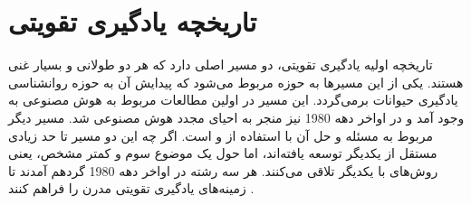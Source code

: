 \section{تاریخچه یادگیری تقویتی}
تاریخچه اولیه یادگیری تقویتی، دو مسیر اصلی دارد که هر دو طولانی و بسیار غنی هستند. یکی از این مسیرها به حوزه  مربوط می‌شود که پیدایش آن به حوزه روانشناسی یادگیری حیوانات برمی‌گردد. این مسیر در اولین مطالعات مربوط به هوش مصنوعی به وجود آمد و در اواخر دهه 1980 نیز منجر به احیای مجدد هوش مصنوعی شد. مسیر دیگر مربوط به مسئله 
\textit{}
و حل آن با استفاده از
\textit{
}
  و
\textit{}
    است. اگر چه این دو مسیر تا حد زیادی مستقل از یکدیگر توسعه یافته‌اند،  اما حول یک موضوع سوم و کمتر مشخص، یعنی روش‌های 
\textit{}
  با یکدیگر تلاقی می‌کنند. هر سه رشته در اواخر دهه 1980 گرد‌هم آمدند تا زمینه‌های یادگیری تقویتی مدرن را فراهم کنند
 \cite{suttonbook}.



